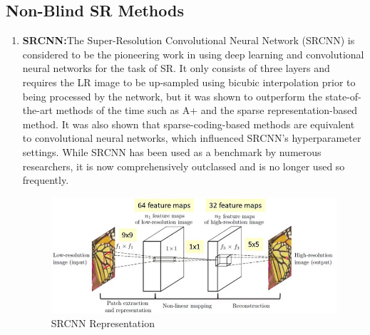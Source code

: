 \subsection{Non-Blind SR Methods}
\begin{enumerate}
    \item {\bf SRCNN:}The Super-Resolution Convolutional Neural Network (SRCNN) is considered to be the
    pioneering work in using deep learning and convolutional neural networks for the task of SR. It only consists of three layers and requires the LR image to be up-sampled using
    bicubic interpolation prior to being processed by the network, but it was shown to outperform the state-of-the-art methods of the time such as A+ and the sparse representation-based method. It was also shown that sparse-coding-based methods are equivalent to convolutional neural networks, which influenced SRCNN’s hyperparameter settings. While SRCNN has been used as a benchmark by numerous researchers, it is now comprehensively outclassed and is no longer used so frequently.
    \begin{figure}[ht]
        \centering
        \includegraphics[width=5in]{./figures/srcnn.jpg}
        \caption{SRCNN Representation}
    \end{figure}
\end{enumerate}